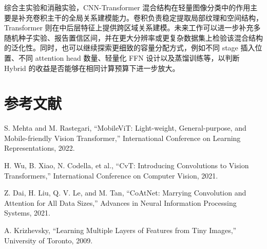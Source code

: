 \documentclass[UTF8,letterpaper,twocolumn]{ctexart}
\begin{document}
综合主实验和消融实验，CNN-Transformer 混合结构在轻量图像分类中的作用主要是补充卷积主干的全局关系建模能力。卷积负责稳定提取局部纹理和空间结构，Transformer 则在中后层特征上提供跨区域关系建模。未来工作可以进一步补充多随机种子实验、报告置信区间，并在更大分辨率或更复杂数据集上检验该混合结构的泛化性。同时，也可以继续探索更细致的容量分配方式，例如不同 stage 插入位置、不同 attention head 数量、轻量化 FFN 设计以及蒸馏训练等，以判断 Hybrid 的收益是否能够在相同计算预算下进一步放大。

\clearpage
\section{参考文献}
\noindent [1] S. Mehta and M. Rastegari, ``MobileViT: Light-weight, General-purpose, and Mobile-friendly Vision Transformer,'' International Conference on Learning Representations, 2022.

\noindent [2] H. Wu, B. Xiao, N. Codella, et al., ``CvT: Introducing Convolutions to Vision Transformers,'' International Conference on Computer Vision, 2021.

\noindent [3] Z. Dai, H. Liu, Q. V. Le, and M. Tan, ``CoAtNet: Marrying Convolution and Attention for All Data Sizes,'' Advances in Neural Information Processing Systems, 2021.

\noindent [4] A. Krizhevsky, ``Learning Multiple Layers of Features from Tiny Images,'' University of Toronto, 2009.
\end{document}
